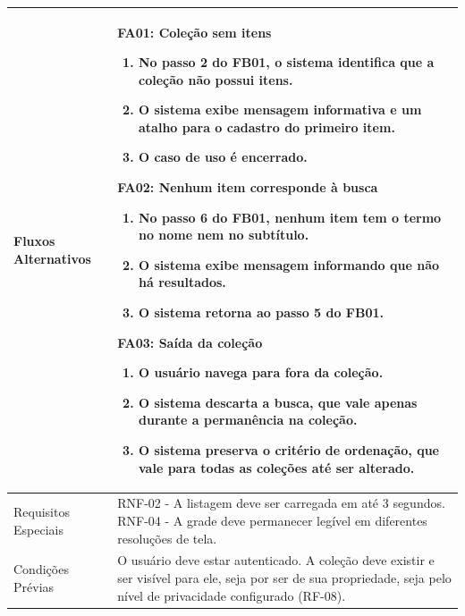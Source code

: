 \begin{longtable}{ >{\raggedright}p{2.8cm} | >{\raggedright\arraybackslash}p{10.7cm} }
Fluxos Alternativos & \mbox{}
\textbf{FA01:} Coleção sem itens
\vspace{2pt}
\begin{enumerate}[nosep,leftmargin=1.2em,topsep=0pt,partopsep=0pt,parsep=0pt,itemsep=0pt,after=\vspace{2pt}]
    \item No passo 2 do FB01, o sistema identifica que a coleção não possui itens.
    \item O sistema exibe mensagem informativa e um atalho para o cadastro do primeiro item.
    \item O caso de uso é encerrado.
\end{enumerate}

\textbf{FA02:} Nenhum item corresponde à busca
\vspace{2pt}
\begin{enumerate}[nosep,leftmargin=1.2em,topsep=0pt,partopsep=0pt,parsep=0pt,itemsep=0pt,after=\vspace{2pt}]
    \item No passo 6 do FB01, nenhum item tem o termo no nome nem no subtítulo.
    \item O sistema exibe mensagem informando que não há resultados.
    \item O sistema retorna ao passo 5 do FB01.
\end{enumerate}

\textbf{FA03:} Saída da coleção
\vspace{2pt}
\begin{enumerate}[nosep,leftmargin=1.2em,topsep=0pt,partopsep=0pt,parsep=0pt,itemsep=0pt,after=\vspace{2pt}]
    \item O usuário navega para fora da coleção.
    \item O sistema descarta a busca, que vale apenas durante a permanência na coleção.
    \item O sistema preserva o critério de ordenação, que vale para todas as coleções até ser alterado.
\end{enumerate}
\mbox{} \\ \hline

Requisitos Especiais & RNF-02 - A listagem deve ser carregada em até 3 segundos. RNF-04 - A grade deve permanecer legível em diferentes resoluções de tela. \\ \hline

Condições Prévias & O usuário deve estar autenticado. A coleção deve existir e ser visível para ele, seja por ser de sua propriedade, seja pelo nível de privacidade configurado (RF-08). \\ \hline


\end{longtable}
